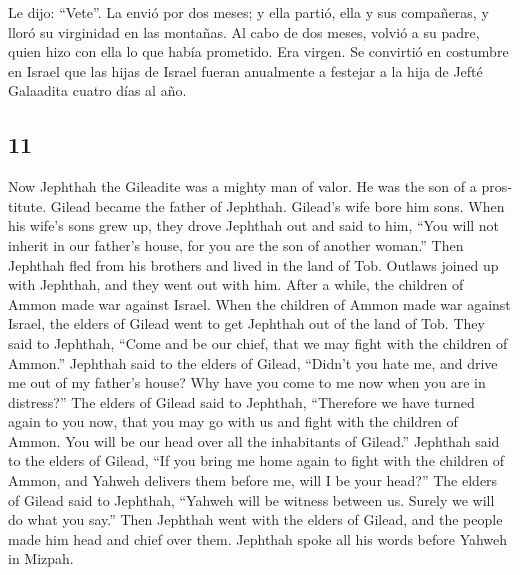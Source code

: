 \begin{paracol}{2}
 Le dijo: ``Vete''. La envió por dos meses; y ella
partió, ella y sus compañeras, y lloró su virginidad en las montañas.
 Al cabo de dos meses, volvió a su padre, quien hizo con
ella lo que había prometido. Era virgen. Se convirtió en costumbre en
Israel  que las hijas de Israel fueran anualmente a
festejar a la hija de Jefté Galaadita cuatro días al año.

\switchcolumn
\begin{otherlanguage}{english}

\hypertarget{section-21}{%
\section{11}\label{section-21}}

 Now Jephthah the Gileadite was a mighty man of valor. He
was the son of a prostitute. Gilead became the father of Jephthah.
 Gilead's wife bore him sons. When his wife's sons grew
up, they drove Jephthah out and said to him, ``You will not inherit in
our father's house, for you are the son of another woman.''
 Then Jephthah fled from his brothers and lived in the
land of Tob. Outlaws joined up with Jephthah, and they went out with
him.  After a while, the children of Ammon made war
against Israel.  When the children of Ammon made war
against Israel, the elders of Gilead went to get Jephthah out of the
land of Tob.  They said to Jephthah, ``Come and be our
chief, that we may fight with the children of Ammon.'' 
Jephthah said to the elders of Gilead, ``Didn't you hate me, and drive
me out of my father's house? Why have you come to me now when you are in
distress?''  The elders of Gilead said to Jephthah,
``Therefore we have turned again to you now, that you may go with us and
fight with the children of Ammon. You will be our head over all the
inhabitants of Gilead.''  Jephthah said to the elders of
Gilead, ``If you bring me home again to fight with the children of
Ammon, and Yahweh delivers them before me, will I be your head?''
 The elders of Gilead said to Jephthah, ``Yahweh will be
witness between us. Surely we will do what you say.'' 
Then Jephthah went with the elders of Gilead, and the people made him
head and chief over them. Jephthah spoke all his words before Yahweh in
Mizpah.

\hypertarget{jephthahs-failed-negotiations-with-the-ammonites}{%
}
\end{otherlanguage}
\end{paracol}
